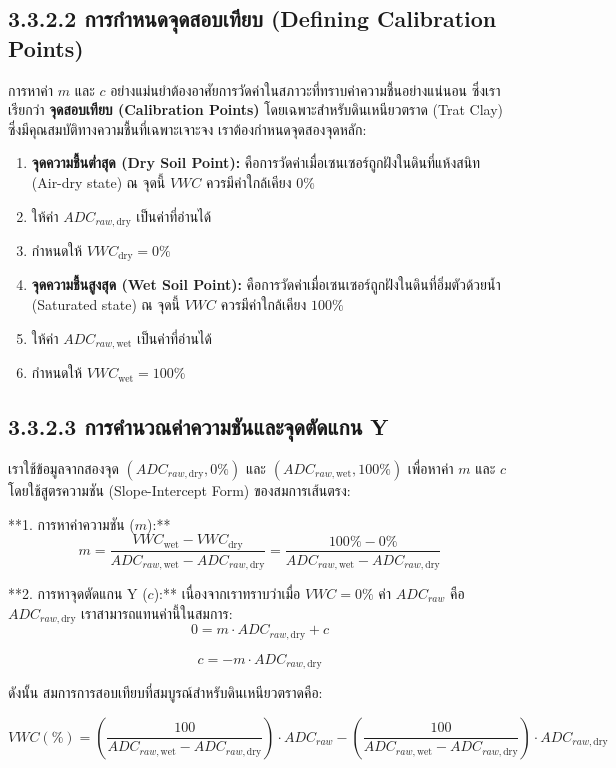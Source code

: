 \documentclass[11pt,a4paper,openany]{report}
\begin{document}
\subsection{3.3.2.2 การกำหนดจุดสอบเทียบ (Defining Calibration Points)}


การหาค่า $m$ และ $c$ อย่างแม่นยำต้องอาศัยการวัดค่าในสภาวะที่ทราบค่าความชื้นอย่างแน่นอน ซึ่งเราเรียกว่า \textbf{จุดสอบเทียบ (Calibration Points)} โดยเฉพาะสำหรับดินเหนียวตราด (Trat Clay) ซึ่งมีคุณสมบัติทางความชื้นที่เฉพาะเจาะจง เราต้องกำหนดจุดสองจุดหลัก:

\begin{enumerate}
  \item \textbf{จุดความชื้นต่ำสุด (Dry Soil Point):} คือการวัดค่าเมื่อเซนเซอร์ถูกฝังในดินที่แห้งสนิท (Air-dry state) ณ จุดนี้ $VWC$ ควรมีค่าใกล้เคียง $0\%$
  \item ให้ค่า $ADC_{raw, \text{dry}}$ เป็นค่าที่อ่านได้
  \item กำหนดให้ $VWC_{\text{dry}} = 0\%$
  \item \textbf{จุดความชื้นสูงสุด (Wet Soil Point):} คือการวัดค่าเมื่อเซนเซอร์ถูกฝังในดินที่อิ่มตัวด้วยน้ำ (Saturated state) ณ จุดนี้ $VWC$ ควรมีค่าใกล้เคียง $100\%$
  \item ให้ค่า $ADC_{raw, \text{wet}}$ เป็นค่าที่อ่านได้
  \item กำหนดให้ $VWC_{\text{wet}} = 100\%$
\end{enumerate}


\subsection{3.3.2.3 การคำนวณค่าความชันและจุดตัดแกน Y}


เราใช้ข้อมูลจากสองจุด $(ADC_{raw, \text{dry}}, 0\%)$ และ $(ADC_{raw, \text{wet}}, 100\%)$ เพื่อหาค่า $m$ และ $c$ โดยใช้สูตรความชัน (Slope-Intercept Form) ของสมการเส้นตรง:

**1. การหาค่าความชัน ($m$):**
$$m = \frac{VWC_{\text{wet}} - VWC_{\text{dry}}}{ADC_{raw, \text{wet}} - ADC_{raw, \text{dry}}} = \frac{100\% - 0\%}{ADC_{raw, \text{wet}} - ADC_{raw, \text{dry}}}$$


**2. การหาจุดตัดแกน Y ($c$):**
เนื่องจากเราทราบว่าเมื่อ $VWC = 0\%$ ค่า $ADC_{raw}$ คือ $ADC_{raw, \text{dry}}$ เราสามารถแทนค่านี้ในสมการ:
$$0 = m \cdot ADC_{raw, \text{dry}} + c$$

$$c = -m \cdot ADC_{raw, \text{dry}}$$


ดังนั้น สมการการสอบเทียบที่สมบูรณ์สำหรับดินเหนียวตราดคือ:

$$VWC (\%) = \left( \frac{100}{ADC_{raw, \text{wet}} - ADC_{raw, \text{dry}}} \right) \cdot ADC_{raw} - \left( \frac{100}{ADC_{raw, \text{wet}} - ADC_{raw, \text{dry}}} \right) \cdot ADC_{raw, \text{dry}}$$
\end{document}
